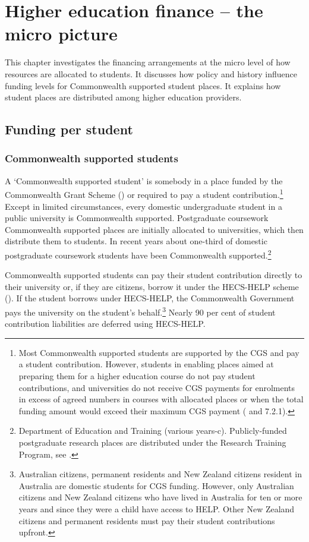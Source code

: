 \documentclass{grattan}
\begin{document}
%
\chapter{Higher education finance -- the micro picture}\label{chap:higher-education-finance-the-micro-picture}

This chapter investigates the financing arrangements at the micro level of how resources are allocated to students. It discusses how policy and history influence funding levels for Commonwealth supported student places. It explains how student places are distributed among higher education providers.

%
\section{Funding per student}\label{sec:funding-per-student}

%
\subsection{Commonwealth supported students}\label{subsec:commonwealth-supported-students}

A `Commonwealth supported student' is somebody in a place funded by the Commonwealth Grant Scheme () or required to pay a student contribution.\footnote{Most Commonwealth supported students are supported by the CGS and pay a student contribution. However, students in enabling places aimed at preparing them for a higher education course do not pay student contributions, and universities do not receive CGS payments for enrolments in excess of agreed numbers in courses with allocated places or when the total funding amount would exceed their maximum CGS payment ( and 7.2.1).} Except in limited circumstances, every domestic undergraduate student in a public university is Commonwealth supported. Postgraduate coursework Commonwealth supported places are initially allocated to universities, which then distribute them to students. In recent years about one-third of domestic postgraduate coursework students have been Commonwealth supported.\footnote{Department of Education and Training (various years-c). Publicly-funded postgraduate research places are distributed under the Research Training Program, see .}

Commonwealth supported students can pay their student contribution directly to their university or, if they are citizens, borrow it under the HECS-HELP scheme (). If the student borrows under HECS-HELP, the Commonwealth Government pays the university on the student's behalf.\footnote{Australian citizens, permanent residents and New Zealand citizens resident in Australia are domestic students for CGS funding. However, only Australian citizens and New Zealand citizens who have lived in Australia for ten or more years and since they were a child have access to HELP. Other New Zealand citizens and permanent residents must pay their student contributions upfront.} Nearly 90 per cent of student contribution liabilities are deferred using HECS-HELP.
\end{document}
